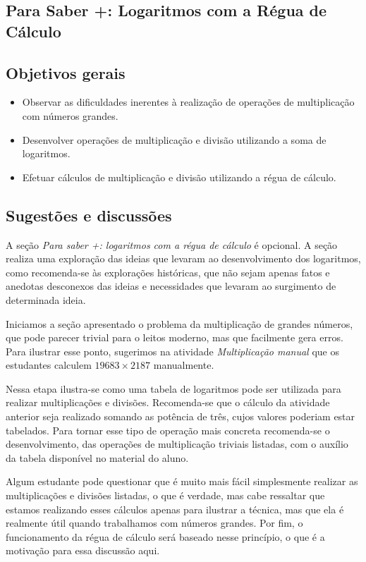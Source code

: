 \clearpage
\begin{texto}
{
\section{Para Saber +: Logaritmos com a Régua de Cálculo}
\subsection{Objetivos gerais}
\begin{itemize}
\item Observar as dificuldades inerentes à realização de operações de multiplicação com números grandes.
\item Desenvolver operações de multiplicação e divisão utilizando a soma de logaritmos.
\item Efetuar cálculos de multiplicação e divisão utilizando a régua de cálculo.
\end{itemize}

\vspace{-\parskip}
\subsection{Sugestões e discussões}
	
A seção \textit{Para saber +: logaritmos com a régua de cálculo} é opcional. A seção realiza uma exploração das ideias que levaram ao desenvolvimento dos logaritmos, como recomenda-se às explorações históricas, que não sejam apenas fatos e anedotas desconexos das ideias e necessidades que levaram ao surgimento de determinada ideia.

Iniciamos a seção apresentado o problema da multiplicação de grandes números, que pode parecer trivial para o leitos moderno, mas que facilmente gera erros. Para ilustrar esse ponto, sugerimos na atividade \textit{Multiplicação manual} que os estudantes calculem $19683 \times 2187$ manualmente.

Nessa etapa ilustra-se como uma tabela de logaritmos pode ser utilizada para realizar multiplicações e divisões. Recomenda-se que o cálculo da atividade anterior seja realizado somando as potência de três, cujos valores poderiam estar tabelados. Para tornar esse tipo de operação mais concreta recomenda-se o desenvolvimento, das operações de multiplicação triviais listadas, com o auxílio da tabela disponível no material do aluno.

Algum estudante pode questionar que é muito mais fácil simplesmente realizar as multiplicações e divisões listadas, o que é verdade, mas cabe ressaltar que estamos realizando esses cálculos apenas para ilustrar a técnica, mas que ela é realmente útil quando trabalhamos com números grandes. Por fim, o funcionamento da régua de cálculo será baseado nesse princípio, o que é a motivação para essa discussão aqui.
}
\end{texto}
